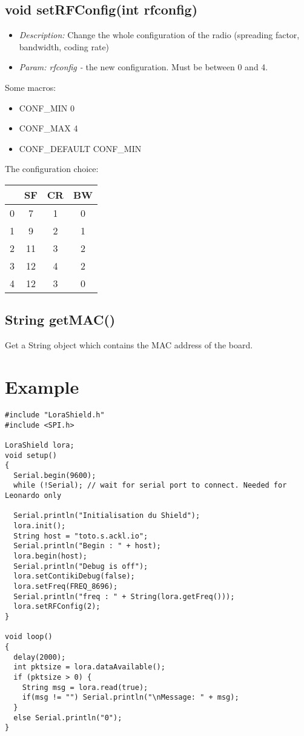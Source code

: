 \documentclass{article}
\begin{document}
\subsection{void setRFConfig(int rfconfig)}
\begin{itemize}
  \item \emph{Description:} Change the whole configuration of the radio (spreading factor, bandwidth, coding rate)
  \item \emph{Param: rfconfig -} the new configuration. Must be between 0 and 4.
\end{itemize}
Some macros:
\begin{itemize}
  \item CONF\_MIN     0
  \item CONF\_MAX     4
  \item CONF\_DEFAULT CONF\_MIN
\end{itemize}
The configuration choice:\\
\begin{tabular}{|c|c|c|c|}
\hline
& SF & CR & BW\\
\hline
0 & 7 & 1 & 0\\
\hline
1 & 9 & 2 & 1\\
\hline
2 & 11 & 3 & 2\\
\hline
3 & 12 & 4 & 2\\
\hline
4 & 12 & 3 & 0\\
\hline
\end{tabular}

\subsection{String getMAC()}
Get a String object which contains the MAC address of the board.

\section{Example}
\begin{verbatim}
#include "LoraShield.h"
#include <SPI.h>

LoraShield lora;
void setup()
{
  Serial.begin(9600);
  while (!Serial); // wait for serial port to connect. Needed for Leonardo only
  
  Serial.println("Initialisation du Shield");
  lora.init();
  String host = "toto.s.ackl.io";
  Serial.println("Begin : " + host);
  lora.begin(host);
  Serial.println("Debug is off");
  lora.setContikiDebug(false);
  lora.setFreq(FREQ_8696);
  Serial.println("freq : " + String(lora.getFreq()));
  lora.setRFConfig(2);
}

void loop()
{
  delay(2000);
  int pktsize = lora.dataAvailable();
  if (pktsize > 0) {
    String msg = lora.read(true);
    if(msg != "") Serial.println("\nMessage: " + msg);
  }
  else Serial.println("0");
}
\end{verbatim}
\end{document}
